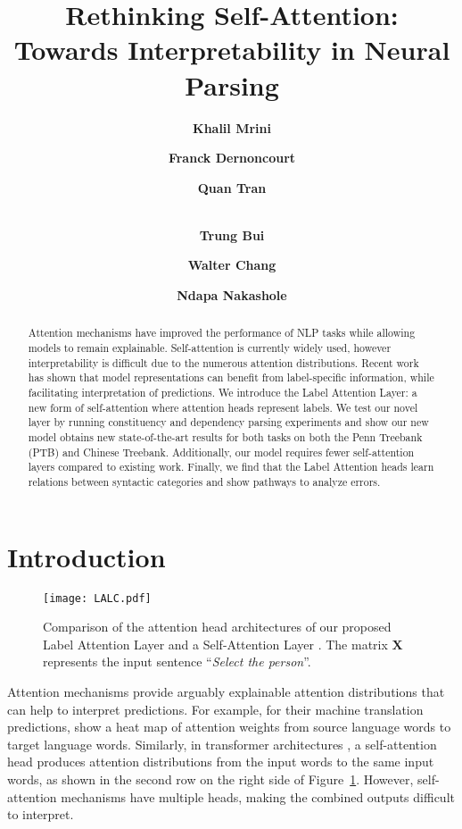 \documentclass[11pt,a4paper]{article}
\title{Rethinking Self-Attention: \\ Towards Interpretability in Neural Parsing}
\author[1]{\bf Khalil Mrini}
\author[2]{\bf Franck Dernoncourt}
\author[2]{\bf Quan Tran}
\author[2]{\\ \bf Trung Bui}
\author[2]{\bf Walter Chang}
\author[1]{\bf Ndapa Nakashole}
\affil[1]{
University of California, San Diego,
La Jolla, CA 92093 \protect\\
\small{\texttt{khalil@ucsd.edu, nnakashole@eng.ucsd.edu}}}
\affil[2]{Adobe Research,
San Jose, CA 95110 \protect\\
\small{\texttt{\{franck.dernoncourt, qtran, bui, wachang\}@adobe.com}}}
\date{}
\begin{document}
\maketitle
\begin{abstract}
Attention mechanisms have improved the performance of NLP tasks while allowing models to remain explainable.
Self-attention is currently widely used, however interpretability is difficult due to the numerous attention distributions. Recent work has shown that model representations can benefit from label-specific information, while facilitating interpretation of predictions. We introduce the Label Attention Layer: a new form of self-attention where attention heads represent labels. We test our novel layer by running constituency and dependency parsing experiments and show our new model obtains new state-of-the-art results for both tasks on both the Penn Treebank (PTB) and Chinese Treebank.
Additionally, our model requires fewer self-attention layers compared to existing work.
Finally, we find that the Label Attention heads learn relations between syntactic categories and show pathways to analyze errors.
\end{abstract}

\section{Introduction}

\begin{figure}
    \centering
    \texttt{[image: LALC.pdf]}
    \caption{Comparison of the attention head architectures of our proposed Label Attention Layer and a Self-Attention Layer \cite{vaswani2017attention}. The matrix $\mathbf{X}$ represents the input sentence ``\textit{Select the person}''.}
    \label{lalc}
\end{figure}

Attention mechanisms \cite{bahdanau2014neural, luong2015effective} provide arguably explainable attention distributions that can help to interpret predictions. For example, for their machine translation predictions, \citet{bahdanau2014neural} show a heat map of attention weights from source language words to target language words. Similarly, in transformer architectures \cite{vaswani2017attention}, a self-attention head produces attention distributions from the input words to the same input words, as shown in the second row on the right side of Figure~\ref{lalc}. However, self-attention mechanisms have multiple heads, making the combined outputs difficult to interpret.
\end{document}

